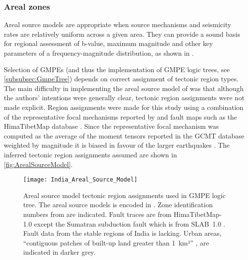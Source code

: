 \documentclass{article}
\begin{document}
\subsubsection{Areal zones}
\label{subsubsec:Areal}

Areal source models are appropriate when source mechanisms and seismicity rates are relatively uniform across a given area.
They can provide a sound basis for regional assessment of b-value, maximum magnitude and other key parameters of a frequency-magnitude distribution, as shown in \cite{thingbaijam2011seismogenic}.

Selection of GMPEs (and thus the implementation of GMPE logic trees, see \autoref{subsubsec:GmpeTree}) depends on correct assignment of tectonic region types.
The main difficulty in implementing the areal source model of \cite{nath2012probabilistic} was that although the authors' intentions were generally clear, tectonic region assignments were not made explicit.
Region assignments were made for this study using a combination of the representative focal mechanisms reported by \cite{nath2012probabilistic} and fault maps such as the HimaTibetMap database \citep{styron2010database}.
Since the representative focal mechanism was computed as the average of the moment tensors reported in the GCMT database weighted by magnitude it is biased in favour of the larger earthquakes \citep{thingbaijam2011seismogenic}.
The inferred tectonic region assignments assumed are shown in \autoref{fig:ArealSourceModel}.

\begin{figure}[!htb]
\begin{adjustbox}{center}
\texttt{[image: India\_Areal\_Source\_Model]}
\end{adjustbox}
\caption[Areal source model]{Areal source model tectonic region assignments used in GMPE logic tree.
The areal source models is encoded in \texttt{}.
Zone identification numbers from \cite{nath2012probabilistic} are indicated.
Fault traces are from HimaTibetMap-1.0 \citep{styron2010database} except the Sumatran subduction fault which is from SLAB~1.0 \citep{hayes2012slab1}.
Fault data from the stable regions of India is lacking.
Urban areas, ``contiguous patches of built-up land greater than 1~km²'' \citep{schneider2009new}, are indicated in darker grey.}
\label{fig:ArealSourceModel}
\end{figure}
\end{document}
